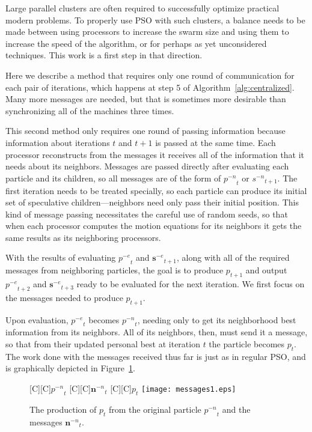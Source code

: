 \documentclass[journal,letterpaper]{IEEEtran}
\newcommand{\fig}[1]{Figure~\ref{fig:#1}}
\newcommand{\alg}[1]{Algorithm~\ref{alg:#1}}
\providecommand{\noeval}[1]{\ensuremath{#1^{-e}}}
\providecommand{\nonbest}[1]{\ensuremath{#1^{-n}}}
\providecommand{\p}{\ensuremath{p}}
\providecommand{\s}{\ensuremath{s}}
\providecommand{\sset}{\ensuremath{\mathbf{s}}}
\providecommand{\nset}{\ensuremath{\mathbf{n}}}
\begin{document}
Large parallel clusters are often required to successfully optimize practical
modern problems.  To properly use PSO with such clusters, a balance needs to be
made between using processors to increase the swarm size and using them to
increase the speed of the algorithm, or for perhaps as yet unconsidered
techniques.  This work is a first step in that direction.


Here we describe a method that requires only one round of communication for
each pair of iterations, which happens at step 5 of \alg{centralized}.  Many
more messages are needed, but that is sometimes more desirable than
synchronizing all of the machines three times.

This second method only requires one round of passing information because
information about iterations $t$ and $t+1$ is passed at the same time.  Each
processor reconstructs from the messages it receives all of the information
that it needs about its neighbors.  Messages are passed directly after
evaluating each particle and its children, so all messages are of the form of
$\nonbest{\p}_t$ or $\nonbest{\s}_{t+1}$.  The first iteration needs to be
treated specially, so each particle can produce its initial set of speculative
children---neighbors need only pass their initial position.  This kind of
message passing necessitates the careful use of random seeds, so that when each
processor computes the motion equations for its neighbors it gets the same
results as its neighboring processors.

With the results of evaluating $\noeval{\p}_t$ and $\noeval{\sset}_{t+1}$,
along with all of the required messages from neighboring particles, the goal is
to produce $\p_{t+1}$ and output $\noeval{\p}_{t+2}$ and $\noeval{\sset}_{t+3}$
ready to be evaluated for the next iteration.  We first focus on the messages
needed to produce $\p_{t+1}$.

Upon evaluation, $\noeval{\p}_t$ becomes $\nonbest{\p}_t$, needing only to get
its neighborhood best information from its neighbors.  All of its neighbors,
then, must send it a message, so that from their updated personal best at
iteration $t$ the particle becomes $\p_t$.  The work done with the messages
received thus far is just as in regular PSO, and is graphically depicted in 
\fig{messages1}.

\begin{figure}
  \centering
  [C][C]{$\nonbest{\p}_{t}$}
  [C][C]{$\nonbest{\nset}_{t}$}
  [C][C]{$\p_{t}$}
  \texttt{[image: messages1.eps]}
  \caption{The production of $\p_{t}$ from the original particle
  $\nonbest{\p}_{t}$ and the messages $\nonbest{\nset}_{t}$.}
  \label{fig:messages1}
\end{figure}
\end{document}
